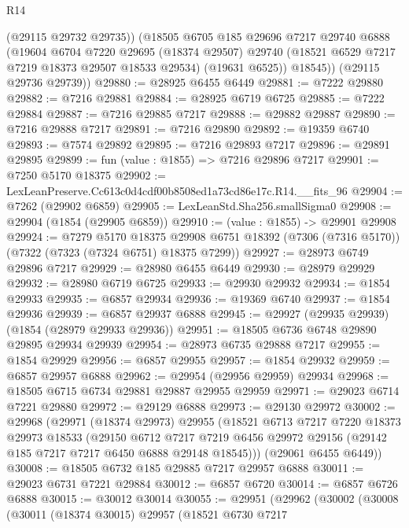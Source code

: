 \begin{lexlean}{R14}
\begin{coremodule}
          (@29115 @29732 @29735))
        (@18505
          @6705
          @185
          @29696
          @7217
          @29740
          @6888
          (@19604
            @6704
            @7220
            @29695
            (@18374 @29507)
            @29740
            (@18521 @6529 @7217 @7219 @18373 @29507 @18533 @29534)
            (@19631 @6525))
          @18545))
      (@29115 @29736 @29739))
@29880 := @28925 @6455 @6449
@29881 := @7222 @29880
@29882 := @7216 @29881
@29884 := @28925 @6719 @6725
@29885 := @7222 @29884
@29887 := @7216 @29885 @7217
@29888 := @29882 @29887
@29890 := @7216 @29888 @7217
@29891 := @7216 @29890
@29892 := @19359 @6740
@29893 := @7574 @29892
@29895 := @7216 @29893 @7217
@29896 := @29891 @29895
@29899 := fun (value : @1855) => @7216 @29896 @7217
@29901 := @7250 @5170 @18375
@29902 := LexLeanPreserve.Cc613c0d4cdf00b8508ed1a73cd86e17c.R14.__fits_96
@29904 := @7262 (@29902 @6859)
@29905 := LexLeanStd.Sha256.smallSigma0
@29908 := @29904 (@1854 (@29905 @6859))
@29910 := (value : @1855) -> @29901 @29908
@29924 := @7279
    @5170
    @18375
    @29908
    @6751
    @18392
    (@7306 (@7316 @5170))
    (@7322 (@7323 (@7324 @6751) @18375 @7299))
@29927 := @28973 @6749 @29896 @7217
@29929 := @28980 @6455 @6449
@29930 := @28979 @29929
@29932 := @28980 @6719 @6725
@29933 := @29930 @29932
@29934 := @1854 @29933
@29935 := @6857 @29934
@29936 := @19369 @6740
@29937 := @1854 @29936
@29939 := @6857 @29937 @6888
@29945 := @29927 (@29935 @29939) (@1854 (@28979 @29933 @29936))
@29951 := @18505 @6736 @6748 @29890 @29895 @29934 @29939
@29954 := @28973 @6735 @29888 @7217
@29955 := @1854 @29929
@29956 := @6857 @29955
@29957 := @1854 @29932
@29959 := @6857 @29957 @6888
@29962 := @29954 (@29956 @29959) @29934
@29968 := @18505 @6715 @6734 @29881 @29887 @29955 @29959
@29971 := @29023 @6714 @7221 @29880
@29972 := @29129 @6888
@29973 := @29130 @29972
@30002 := @29968
    (@29971
      (@18374 @29973)
      @29955
      (@18521
        @6713
        @7217
        @7220
        @18373
        @29973
        @18533
        (@29150
          @6712
          @7217
          @7219
          @6456
          @29972
          @29156
          (@29142 @185 @7217 @7217 @6450 @6888 @29148 @18545)))
      (@29061 @6455 @6449))
@30008 := @18505 @6732 @185 @29885 @7217 @29957 @6888
@30011 := @29023 @6731 @7221 @29884
@30012 := @6857 @6720
@30014 := @6857 @6726 @6888
@30015 := @30012 @30014
@30055 := @29951
    (@29962
      (@30002
        (@30008
          (@30011
            (@18374 @30015)
            @29957
            (@18521
              @6730
              @7217

\end{coremodule}
\end{lexlean}
